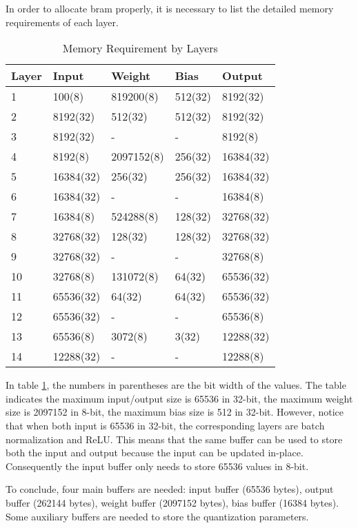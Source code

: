 In order to allocate \gls{bram} properly, it is necessary to list the detailed memory requirements of each
layer.

\begin{table}[h]
  \centering
  \caption{Memory Requirement by Layers}
  \begin{tabular}{l | l | l | l | l}
    \toprule
    Layer & Input & Weight & Bias & Output \\
    \midrule
    1 & 100(8) & 819200(8) & 512(32) & 8192(32) \\
    2 & 8192(32) & 512(32) & 512(32) & 8192(32) \\
    3 & 8192(32) & - & - & 8192(8) \\
    4 & 8192(8) & 2097152(8) & 256(32) & 16384(32) \\
    5 & 16384(32) & 256(32) & 256(32) & 16384(32) \\
    6 & 16384(32) & - & - & 16384(8) \\
    7 & 16384(8) & 524288(8) & 128(32) & 32768(32) \\
    8 & 32768(32) & 128(32) & 128(32) & 32768(32) \\
    9 & 32768(32) & - & - & 32768(8) \\
    10 & 32768(8) & 131072(8) & 64(32) & 65536(32) \\
    11 & 65536(32) & 64(32) & 64(32) & 65536(32) \\
    12 & 65536(32) & - & - & 65536(8) \\
    13 & 65536(8) & 3072(8) & 3(32) & 12288(32) \\
    14 & 12288(32) & - & - & 12288(8) \\
    \bottomrule
  \end{tabular}
  \label{table:memory_requirements}
\end{table}

In table \ref{table:memory_requirements}, the numbers in parentheses are the bit width of the values. The table
indicates the maximum input/output size is 65536 in 32-bit, the maximum weight size is 2097152 in 8-bit, the
maximum bias size is 512 in 32-bit. However, notice that when both input is 65536 in 32-bit, the corresponding
layers are batch normalization and ReLU. This means that the same buffer can be used to store both the
input and output because the input can be updated in-place. Consequently the input buffer only needs to
store 65536 values in 8-bit.

To conclude, four main buffers are needed: input buffer (65536 bytes), output buffer (262144 bytes),
weight buffer (2097152 bytes), bias buffer (16384 bytes). Some auxiliary buffers are needed to store
the quantization parameters.


